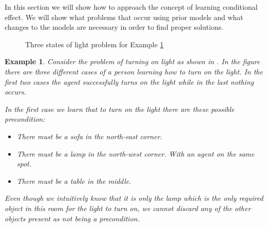 \documentclass[../Master.tex]{subfiles}
\begin{document}
In this section we will show how to approach the concept of learning conditional effect. We will show what problems that occur using prior models and what changes to the models are necessary in order to find proper solutions.  

\begin{figure}
	
	
	\caption{\label{fig:House-example}Three states of light problem for Example \ref{thm:house-example}}
	
	
	
\end{figure}

\newtheorem{thm-house-example}{Example}[section]
\begin{thm-house-example}\label{thm:house-example}
Consider the problem of turning on light as shown in .
In the figure there are three different cases of a person learning how to turn on the
light. In the first two cases the agent successfully turns on the light while in the last nothing occurs.

In the first case we learn that to turn on the light there are these possible precondition:
\begin{itemize}
	\item There must be a sofa in the north-east corner.
	\item There must be a lamp in the north-west corner. With an agent on the same spot.
	\item There must be a table in the middle.
\end{itemize}
Even though we intuitively know that it is only the lamp which is the only required object in this room for the light to turn on, we cannot discard any of the other objects present as not being a precondition. 
\end{thm-house-example}
\end{document}
